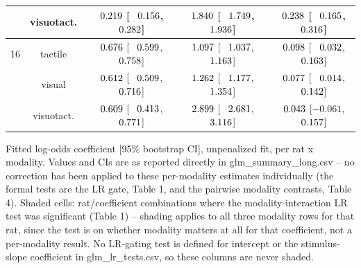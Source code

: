 \begin{longtable}{lcccc}
 & visuotact. & $\hphantom{-}0.219$ [$\hphantom{-}0.156$, $\hphantom{-}0.282$] & $\hphantom{-}1.840$ [$\hphantom{-}1.749$, $\hphantom{-}1.936$] & \cellcolor{gray!15}$\hphantom{-}0.238$ [$\hphantom{-}0.165$, $\hphantom{-}0.316$] \\
\midrule
16 & tactile & $\hphantom{-}0.676$ [$\hphantom{-}0.599$, $\hphantom{-}0.758$] & $\hphantom{-}1.097$ [$\hphantom{-}1.037$, $\hphantom{-}1.163$] & $\hphantom{-}0.098$ [$\hphantom{-}0.032$, $\hphantom{-}0.163$] \\
 & visual & $\hphantom{-}0.612$ [$\hphantom{-}0.509$, $\hphantom{-}0.716$] & $\hphantom{-}1.262$ [$\hphantom{-}1.177$, $\hphantom{-}1.354$] & $\hphantom{-}0.077$ [$\hphantom{-}0.014$, $\hphantom{-}0.142$] \\
 & visuotact. & $\hphantom{-}0.609$ [$\hphantom{-}0.413$, $\hphantom{-}0.771$] & $\hphantom{-}2.899$ [$\hphantom{-}2.681$, $\hphantom{-}3.116$] & $\hphantom{-}0.043$ [$-0.061$, $\hphantom{-}0.157$] \\
\end{longtable}
\vspace{4pt}
\par\noindent
\begin{minipage}{\linewidth}\small Fitted log-odds coefficient [95\% bootstrap CI], unpenalized fit, per rat x modality. Values and CIs are as reported directly in glm\_summary\_long.csv -- no correction has been applied to these per-modality estimates individually (the formal tests are the LR gate, Table 1, and the pairwise modality contrasts, Table 4). Shaded cells: rat/coefficient combinations where the modality-interaction LR test was significant (Table 1) -- shading applies to all three modality rows for that rat, since the test is on whether modality matters at all for that coefficient, not a per-modality result. No LR-gating test is defined for intercept or the stimulus-slope coefficient in glm\_lr\_tests.csv, so these columns are never shaded. \end{minipage}